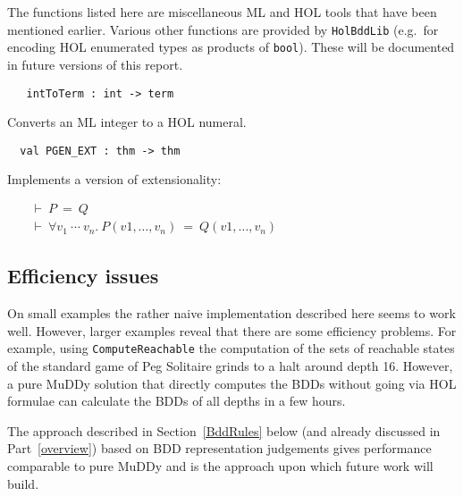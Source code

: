 \documentclass[12pt]{article}
\newcommand{\bnind}[1]{\index[MLbn]{#1}}
\renewcommand{\t}[1]{\mbox{\tt #1}}
\newcommand{\ml}[1]{{\tt #1}}
\newcommand\HOL{HOL\xspace}
\newcommand{\Muddy}{MuDDy\xspace}
\newcommand\turn{{\vdash}}
\begin{document}
The functions listed here are miscellaneous ML and \HOL{} tools that have been mentioned earlier.
Various other functions are provided by \t{HolBddLib} (e.g.~for encoding \HOL{} enumerated types
as products of \t{bool}). These will be documented in future versions of this report.


\begin{verbatim}
   intToTerm : int -> term
\end{verbatim}\bnind{\ml{intToTerm}}

Converts an ML integer to a \HOL{} numeral.

\begin{verbatim}
  val PGEN_EXT : thm -> thm
\end{verbatim}\bnind{\ml{PGEN\_EXT}}

Implements a version of extensionality:

\smallskip

~~~$\begin{array}{c}
\turn~P~=~Q \\ \hline
\turn~\forall v_1~\cdots~v_n.~P(v1,\ldots,v_n)~=~Q(v1,\ldots,v_n)
\end{array}$


%
%

\subsection{Efficiency issues}\label{performance}

On small examples the rather naive implementation described here
seems to work well.
However, larger examples reveal that there are some efficiency
problems.  For example, using \t{ComputeReachable} the computation of
the sets of reachable states of the standard game of Peg Solitaire
grinds to a halt around depth 16. However, a pure MuDDy solution that
directly computes the BDDs without going via HOL formulae can
calculate the BDDs of all depths in a few hours.

The approach described in Section~\ref{BddRules} below (and already
discussed in Part~\ref{overview}) based on BDD representation
judgements gives performance comparable to pure \Muddy{} and is the
approach upon which future work will build.
\end{document}
